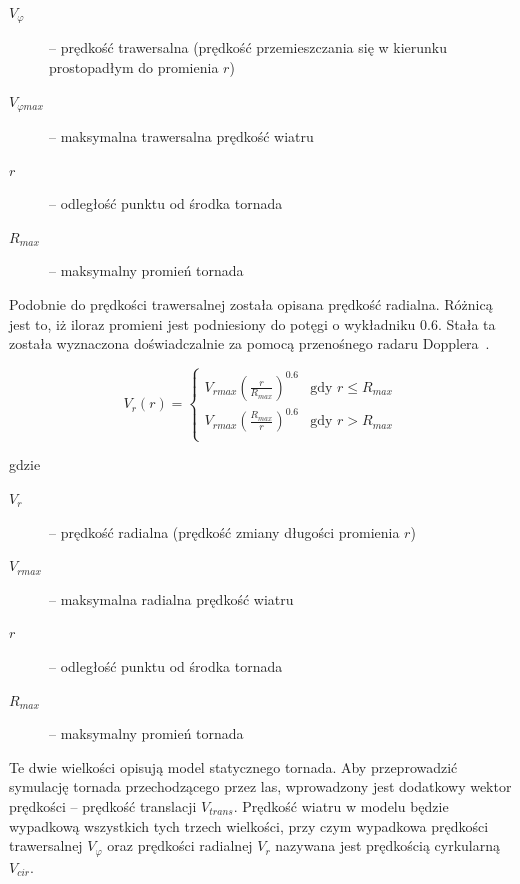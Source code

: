\begin{description}
  \item[$V_{\varphi}$] --  prędkość trawersalna (prędkość przemieszczania się w kierunku prostopadłym do promienia $r$)
  \item[${V_{\varphi  max}}$ ]-- maksymalna trawersalna prędkość wiatru
  \item[$r$ ]-- odległość punktu od środka tornada
  \item[$R_{max}$]-- maksymalny promień tornada
\end{description}

Podobnie do prędkości trawersalnej została opisana prędkość radialna. Różnicą jest to, iż iloraz promieni jest podniesiony do potęgi o wykładniku $0.6$. Stała ta została wyznaczona doświadczalnie za pomocą przenośnego radaru Dopplera~\cite{hb_doppler}.

\begin{equation}
V_{r}(r) =  \left\{ \begin{array}{ll}
V_{r  max}(\frac{r}{R_{max}})^{0.6} & \textrm{gdy $r \leq R_{max}$}\\
V_{r  max}(\frac{R_{max}}{r})^{0.6} & \textrm{gdy $r > R_{max}$}\\
\end{array} \right.
\end{equation}

gdzie

\begin{description}
  \item[$V_{r}$] --  prędkość radialna (prędkość zmiany długości promienia $r$)
  \item[${V_{r  max}}$ ]-- maksymalna radialna prędkość wiatru
  \item[$r$ ]-- odległość punktu od środka tornada
  \item[$R_{max}$]-- maksymalny promień tornada
\end{description}

Te dwie wielkości opisują model statycznego tornada. Aby przeprowadzić symulację tornada przechodzącego przez las, wprowadzony jest dodatkowy wektor prędkości -- prędkość translacji $V_{trans}$. Prędkość wiatru w modelu będzie wypadkową wszystkich tych trzech wielkości, przy czym wypadkowa prędkości trawersalnej $V_{\varphi}$ oraz prędkości radialnej $V_r$ nazywana jest prędkością cyrkularną $V_{cir}$.

